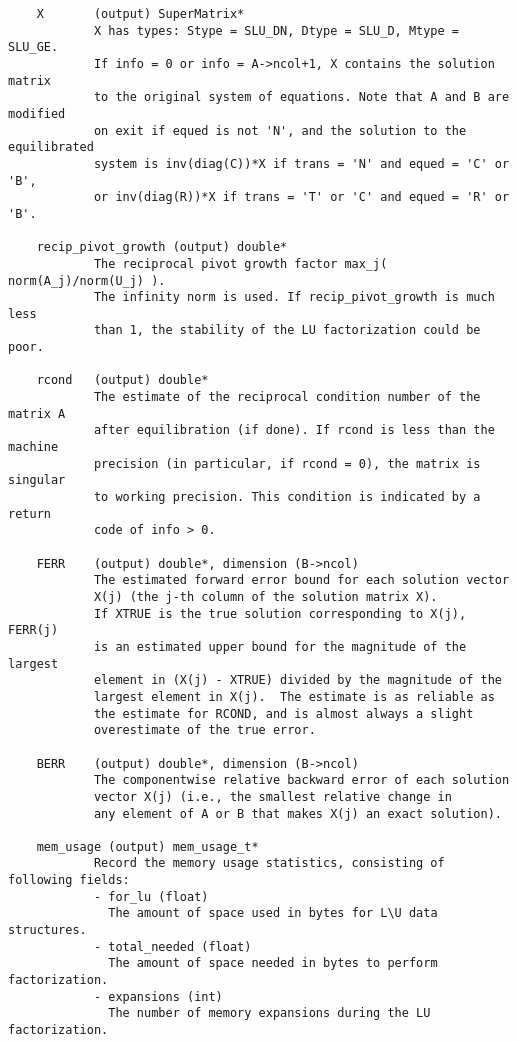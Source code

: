 \begin{verbatim}
    X       (output) SuperMatrix*
            X has types: Stype = SLU_DN, Dtype = SLU_D, Mtype = SLU_GE. 
            If info = 0 or info = A->ncol+1, X contains the solution matrix
            to the original system of equations. Note that A and B are modified
            on exit if equed is not 'N', and the solution to the equilibrated
            system is inv(diag(C))*X if trans = 'N' and equed = 'C' or 'B',
            or inv(diag(R))*X if trans = 'T' or 'C' and equed = 'R' or 'B'.
   
    recip_pivot_growth (output) double*
            The reciprocal pivot growth factor max_j( norm(A_j)/norm(U_j) ).
            The infinity norm is used. If recip_pivot_growth is much less
            than 1, the stability of the LU factorization could be poor.
   
    rcond   (output) double*
            The estimate of the reciprocal condition number of the matrix A
            after equilibration (if done). If rcond is less than the machine
            precision (in particular, if rcond = 0), the matrix is singular
            to working precision. This condition is indicated by a return
            code of info > 0.
   
    FERR    (output) double*, dimension (B->ncol)   
            The estimated forward error bound for each solution vector   
            X(j) (the j-th column of the solution matrix X).   
            If XTRUE is the true solution corresponding to X(j), FERR(j) 
            is an estimated upper bound for the magnitude of the largest 
            element in (X(j) - XTRUE) divided by the magnitude of the   
            largest element in X(j).  The estimate is as reliable as   
            the estimate for RCOND, and is almost always a slight   
            overestimate of the true error.
   
    BERR    (output) double*, dimension (B->ncol)
            The componentwise relative backward error of each solution   
            vector X(j) (i.e., the smallest relative change in   
            any element of A or B that makes X(j) an exact solution).
   
    mem_usage (output) mem_usage_t*
            Record the memory usage statistics, consisting of following fields:
            - for_lu (float)
              The amount of space used in bytes for L\U data structures.
            - total_needed (float)
              The amount of space needed in bytes to perform factorization.
            - expansions (int)
              The number of memory expansions during the LU factorization.
   

\end{verbatim}
